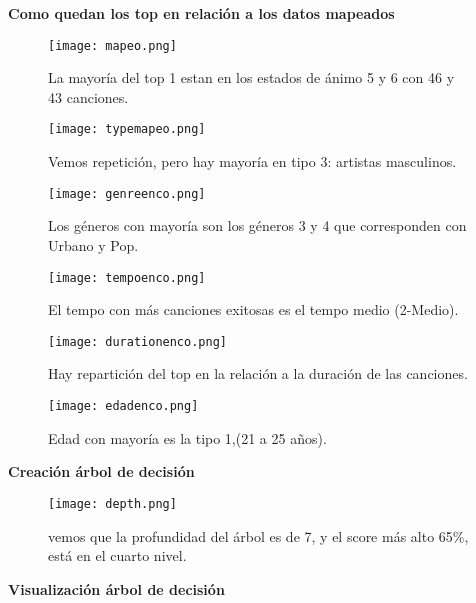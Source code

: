 \documentclass{article}
\begin{document}
\textbf{Como quedan los top en relación a los datos mapeados}


\begin{figure}[H]
    \centering
\texttt{[image: mapeo.png]}
    \caption{{\small La mayoría del top 1 estan en los estados de ánimo 5 y 6 con 46 y 43 canciones.}}
    \label{fig:enter-label}
\end{figure}


\begin{figure}[H]
    \centering
\texttt{[image: typemapeo.png]}
    \caption{{\small Vemos repetición, pero hay mayoría en tipo 3: artistas masculinos.}}
    \label{fig:enter-label}
\end{figure}


\begin{figure}[H]
    \centering
\texttt{[image: genreenco.png]}
    \caption{{\small Los géneros con mayoría son los géneros 3 y 4 que corresponden con Urbano y Pop.}}
    \label{fig:enter-label}
\end{figure}

\begin{figure}[H]
    \centering
\texttt{[image: tempoenco.png]}
    \caption{{\small El tempo con más canciones exitosas es el tempo medio (2-Medio). }}
    \label{fig:enter-label}
\end{figure}

\begin{figure}[H]
    \centering
\texttt{[image: durationenco.png]}
    \caption{{\small Hay repartición del top en la relación a la duración de las canciones.}}
    \label{fig:enter-label}
\end{figure}

\begin{figure}[H]
    \centering
\texttt{[image: edadenco.png]}
    \caption{{\small Edad con mayoría es la tipo 1,(21 a 25 años). }}
    \label{fig:enter-label}
\end{figure}


\textbf{Creación árbol de decisión}

\begin{figure}[H]
    \centering
\texttt{[image: depth.png]}
    \caption{{\small vemos que la profundidad del árbol es de 7, y  el score más alto 65\%, está en el cuarto nivel. }}
    \label{fig:enter-label}
\end{figure}


\textbf{Visualización árbol de decisión}
\end{document}
